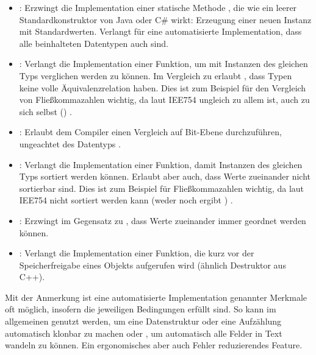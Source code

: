 \begin{itemize}
	\item {}: Erzwingt die Implementation einer statische Methode , die wie ein leerer Standardkonstruktor von Java oder C\# wirkt: Erzeugung einer neuen Instanz mit Standardwerten.
	Verlangt für eine automatisierte Implementation, dass alle beinhalteten Datentypen auch  sind.
	
	\item {}: Verlangt die Implementation einer Funktion, um mit Instanzen des gleichen Typs verglichen werden zu können.
	Im Vergleich zu  erlaubt , dass Typen keine volle Äquivalenzrelation haben.
	Dies ist zum Beispiel für den Vergleich von Fließkommazahlen wichtig, da laut IEE754   ungleich zu allem ist, auch zu sich selbst () \cite{wiki:nan}\cite[272-275]{rust:orly_programming}\cite{rust:doc:partialeq}.
	
	\item {}: Erlaubt dem Compiler einen Vergleich auf Bit-Ebene durchzuführen, ungeachtet des Datentyps \cite{rust:doc:eq}.
	
	\item {}: Verlangt die Implementation einer Funktion, damit Instanzen des gleichen Typs sortiert werden können. Erlaubt aber auch, dass Werte zueinander nicht sortierbar sind.
	Dies ist zum Beispiel für Fließkommazahlen wichtig, da laut IEE754   nicht sortiert werden kann (weder  noch  ergibt ) \cite{wiki:nan}\cite[275-277]{rust:orly_programming}\cite{rust:doc:partialord}.
	
	\item {}: Erzwingt im Gegensatz zu , dass Werte zueinander immer geordnet werden können.
	
	\item {}: Verlangt die Implementation einer Funktion, die kurz vor der Speicherfreigabe eines Objekts aufgerufen wird (ähnlich Destruktor aus C++).
\end{itemize}

Mit der Anmerkung \rustcinline{#[derive(..)]} ist eine automatisierte Implementation genannter Merkmale oft möglich, insofern die jeweiligen Bedingungen erfüllt sind.
So kann im allgemeinen  genutzt werden, um eine Datenstruktur oder eine Aufzählung automatisch klonbar zu machen oder , um automatisch alle Felder in Text wandeln zu können.
Ein ergonomisches aber auch Fehler reduzierendes Feature.

